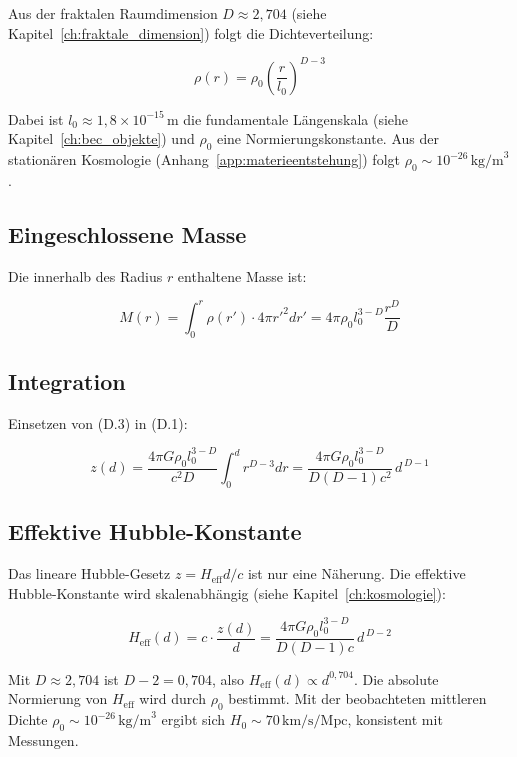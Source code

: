 Aus der fraktalen Raumdimension \( D \approx 2,704 \) (siehe Kapitel~\ref{ch:fraktale_dimension}) folgt die Dichteverteilung:

\[
\rho(r) = \rho_0 \left( \frac{r}{l_0} \right)^{D-3} \tag{D.2}
\]

Dabei ist \( l_0 \approx 1,8 \times 10^{-15} \, \text{m} \) die fundamentale Längenskala (siehe Kapitel~\ref{ch:bec_objekte}) und \( \rho_0 \) eine Normierungskonstante. Aus der stationären Kosmologie (Anhang~\ref{app:materieentstehung}) folgt \( \rho_0 \sim 10^{-26} \, \text{kg/m}^3 \).

\subsection{Eingeschlossene Masse}
\label{sub:herleitungen_rot_masse}

Die innerhalb des Radius \( r \) enthaltene Masse ist:

\[
M(r) = \int_0^r \rho(r') \cdot 4\pi r'^2 dr' = 4\pi \rho_0 l_0^{3-D} \frac{r^D}{D} \tag{D.3}
\]

\subsection{Integration}
\label{sub:herleitungen_rot_integration}

Einsetzen von (D.3) in (D.1):

\[
z(d) = \frac{4\pi G \rho_0 l_0^{3-D}}{c^2 D} \int_0^d r^{D-3} dr = \frac{4\pi G \rho_0 l_0^{3-D}}{D(D-1)c^2} \, d^{\,D-1} \tag{D.4}
\]

\subsection{Effektive Hubble-Konstante}
\label{sub:herleitungen_rot_hubble}

Das lineare Hubble-Gesetz \( z = H_{\text{eff}} d / c \) ist nur eine Näherung. Die effektive Hubble-Konstante wird skalenabhängig (siehe Kapitel~\ref{ch:kosmologie}):

\[
H_{\text{eff}}(d) = c \cdot \frac{z(d)}{d} = \frac{4\pi G \rho_0 l_0^{3-D}}{D(D-1)c} \, d^{\,D-2} \tag{D.5}
\]

Mit \( D \approx 2,704 \) ist \( D-2 = 0,704 \), also \( H_{\text{eff}}(d) \propto d^{0,704} \). Die absolute Normierung von \( H_{\text{eff}} \) wird durch \( \rho_0 \) bestimmt. Mit der beobachteten mittleren Dichte \( \rho_0 \sim 10^{-26} \, \text{kg/m}^3 \) ergibt sich \( H_0 \sim 70 \, \text{km/s/Mpc} \), konsistent mit Messungen.

